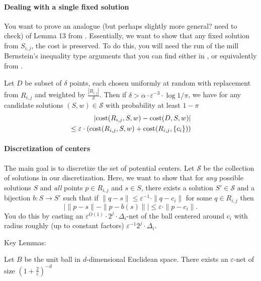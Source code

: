\paragraph{Dealing with a single fixed solution}

You want to prove an analogue (but perhaps slightly more general? need to check) of Lemma 13 from \cite{cohen2019fixed}. Essentially, we want to show that any fixed solution from $S_{i,j}$, the cost is preserved.
To do this, you will need the run of the mill Bernstein's inequality type arguments that you can find either in \cite{cohen2019fixed}, or equivalently from \cite{stoc}.

\begin{lemma}
Let $D$ be subset of $\delta$ points, each chosen uniformly at random with replacement from $R_{i,j}$ and weighted by $\frac{|R_{i,j}|}{\delta}$. Then if $\delta > \alpha\cdot \varepsilon^{-3}\cdot \log 1/\pi$, we have for any candidate solutions $(S,w)\in \mathcal{S}$ with probability at least $1-\pi$
\begin{eqnarray*}
|\text{cost}(R_{i,j},S,w)-\text{cost}(D,S,w)|\\
\leq \varepsilon\cdot \left(\text{cost}(R_{i,j},S,w) + \text{cost}(R_{i,j},\{c_i\})\right)
\end{eqnarray*}
\end{lemma}

\paragraph{Discretization of centers}
The main goal is to discretize the set of potential centers. Let $\mathcal{S}$ be the collection of solutions in our discretization. Here, we want to show that for \emph{any} possible solutions $S$ and \emph{all} points $p\in R_{i,j}$ and $s\in S$, there exists a solution $S'\in \mathcal{S}$ and a bijection $b:S\rightarrow S'$ such that if $\|q-s\| \leq \varepsilon^{-1} \cdot \|q-c_i\|$ for some $q\in R_{i,j}$ then
$$ \left\vert \|p-s\| - \|p-b(s)\| \right\vert\leq \varepsilon\cdot \|p-c_i\|.  $$ 
You do this by casting an $\varepsilon^{O(1)}\cdot 2^j\cdot \Delta_i$-net of the ball centered around $c_i$ with radius roughly (up to constant factors) $\varepsilon^{-1} 2^j\cdot \Delta_i$.

Key Lemmas:


\begin{lemma}
Let $B$ be the unit ball in $d$-dimensional Euclidean space.
There exists an $\varepsilon$-net of size $\left(1+\frac{2}{\varepsilon}\right)^{-d}$
\end{lemma}


